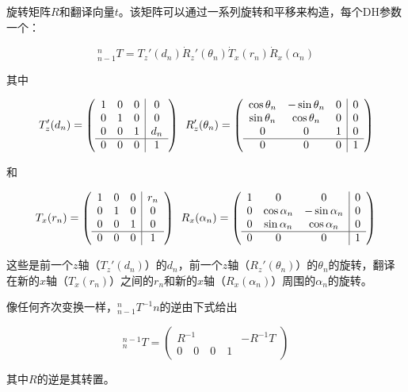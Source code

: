 旋转矩阵$R$和翻译向量$t$。该矩阵可以通过一系列旋转和平移来构造，每个DH参数一个：

\begin{equation}
_{n-1}^nT=T_z'(d_n)\dot R_z'(\theta_n) \dot T_x(r_n) \dot R_x(\alpha_n)
\end{equation}

其中

\begin{equation}
T_z'(d_n)=
\left(
\begin{array}{ccc|c}
1 & 0 & 0 & 0\\
0 & 1 & 0 & 0\\
0 & 0 & 1 & d_n\\
\hline
0 & 0 & 0 & 1
\end{array}
\right)
\enskip
R_z'(\theta_n)=\left(
\begin{array}{ccc|c}
\cos\theta_n & -\sin\theta_n & 0 & 0\\
\sin\theta_n & \cos\theta_n & 0 & 0\\
0 & 0 & 1 & 0\\
\hline
0 & 0 & 0 & 1
\end{array}
\right)
\end{equation}

和

\begin{equation}
T_x(r_n)=
\left(
\begin{array}{ccc|c}
1 & 0 & 0 & r_n\\
0 & 1 & 0 & 0\\
0 & 0 & 1 & 0\\
\hline
0 & 0 & 0 & 1
\end{array}
\right)
\enskip
R_x(\alpha_n)=\left(
\begin{array}{ccc|c}
1 & 0 & 0 & 0\\
0 & \cos\alpha_n & -\sin\alpha_n & 0\\
0 & \sin\alpha_n & \cos\alpha_n & 0\\
\hline
0 & 0 & 0 & 1
\end{array}
\right)
\end{equation} 

这些是前一个$z$轴（$T_z'(d_n)$）的$d_n$，前一个$z$轴（$R_z'(\theta_n)$）的$\theta_n$的旋转，翻译在新的$x$轴（$T_x(r_n)$）之间的$r_n$和新的$x$轴（$R_x(\alpha_n)$）周围的$\alpha_n$的旋转。


像任何齐次变换一样，$_{n-1}^nT^{-1}n$的逆由下式给出

\begin{equation}
^{n-1}_nT=\left(
\begin{array}{c|c}
R^{-1} & -R^{-1}T\\
\hline
0 \quad 0 \quad 0 \quad 1
\end{array}
\right)
\end{equation}

其中$R$的逆是其转置。
